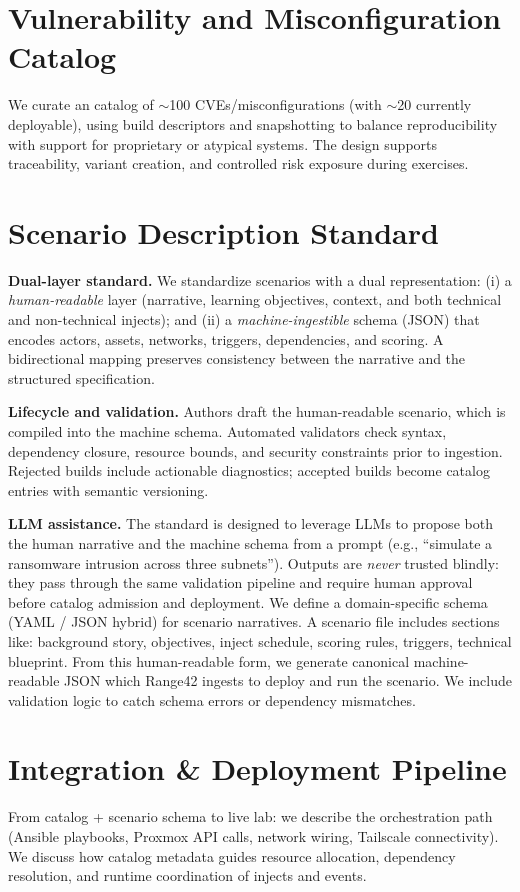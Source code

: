 \documentclass[11pt]{article}
\begin{document}
\section{Vulnerability and Misconfiguration Catalog}
We curate an catalog of $\sim$100 CVEs/misconfigurations (with $\sim$20 currently deployable), using build descriptors and snapshotting to balance reproducibility with support for proprietary or atypical systems. The design supports traceability, variant creation, and controlled risk exposure during exercises.

\section{Scenario Description Standard}

\textbf{Dual-layer standard.} We standardize scenarios with a dual representation:
(i) a \emph{human-readable} layer (narrative, learning objectives, context, and both technical and non-technical injects); and
(ii) a \emph{machine-ingestible} schema (JSON) that encodes actors, assets, networks, triggers, dependencies, and scoring.
A bidirectional mapping preserves consistency between the narrative and the structured specification.

\textbf{Lifecycle and validation.} Authors draft the human-readable scenario, which is compiled into the machine schema.
Automated validators check syntax, dependency closure, resource bounds, and security constraints prior to ingestion.
Rejected builds include actionable diagnostics; accepted builds become catalog entries with semantic versioning.

\textbf{LLM assistance.} The standard is designed to leverage LLMs to propose both the human narrative and the machine schema from a prompt (e.g., ``simulate a ransomware intrusion across three subnets'').
Outputs are \emph{never} trusted blindly: they pass through the same validation pipeline and require human approval before catalog admission and deployment.
We define a domain-specific schema (YAML / JSON hybrid) for scenario narratives. A scenario file includes sections like: background story, objectives, inject schedule, scoring rules, triggers, technical blueprint. From this human-readable form, we generate canonical machine-readable JSON which Range42 ingests to deploy and run the scenario. We include validation logic to catch schema errors or dependency mismatches.

\section{Integration \& Deployment Pipeline}
From catalog + scenario schema to live lab: we describe the orchestration path (Ansible playbooks, Proxmox API calls, network wiring, Tailscale connectivity). We discuss how catalog metadata guides resource allocation, dependency resolution, and runtime coordination of injects and events.
\end{document}
